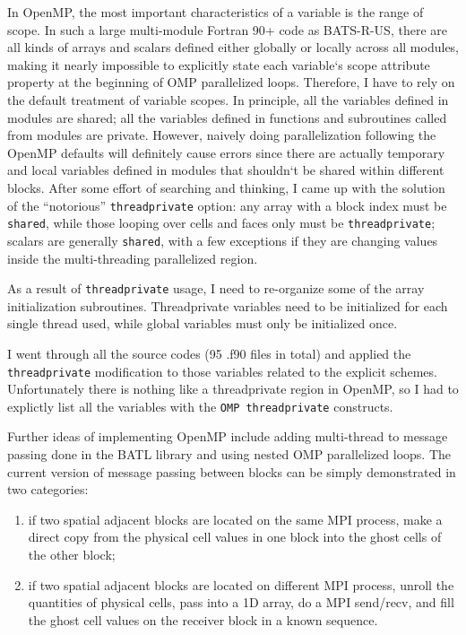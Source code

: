 \documentclass[fleqn,11pt]{SelfArx} %
\begin{document}
In OpenMP, the most important characteristics of a variable is the range of scope. In such a large multi-module Fortran 90+ code as BATS-R-US, there are all kinds of arrays and scalars defined either globally or locally across all modules, making it nearly impossible to explicitly state each variable`s scope attribute property at the beginning of OMP parallelized loops. Therefore, I have to rely on the default treatment of variable scopes. In principle, all the variables defined in modules are shared; all the variables defined in functions and subroutines called from modules are private. However, naively doing parallelization following the OpenMP defaults will definitely cause errors since there are actually temporary and local variables defined in modules that shouldn`t be shared within different blocks. After some effort of searching and thinking, I came up with the solution of the ``notorious'' \verb|threadprivate| option: any array with a block index must be \verb|shared|, while those looping over cells and faces only must be \verb|threadprivate|; scalars are generally \verb|shared|, with a few exceptions if they are changing values inside the multi-threading parallelized region.

As a result of \verb|threadprivate| usage, I need to re-organize some of the array initialization subroutines. Threadprivate variables need to be initialized for each single thread used, while global variables must only be initialized once. 

I went through all the source codes (95 .f90 files in total) and applied the \verb|threadprivate| modification to those variables related to the explicit schemes. Unfortunately there is nothing like a threadprivate region in OpenMP, so I had to explictly list all the variables with the \verb|OMP threadprivate| constructs.


Further ideas of implementing OpenMP include adding multi-thread to message passing done in the BATL library and using nested OMP parallelized loops. The current version of message passing between blocks can be simply demonstrated in two categories:
\begin{enumerate}
\item if two spatial adjacent blocks are located on the same MPI process, make a direct copy from the physical cell values in one block into the ghost cells of the other block;
\item if two spatial adjacent blocks are located on different MPI process, unroll the quantities of physical cells, pass into a 1D array, do a MPI send/recv, and fill the ghost cell values on the receiver block in a known sequence.
\end{enumerate}
\end{document}
